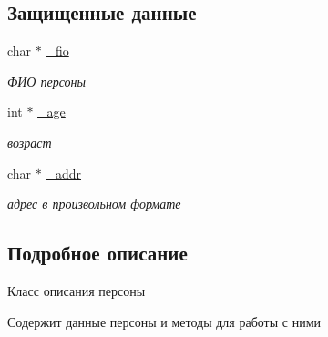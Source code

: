 \subsection*{Защищенные данные}
\begin{DoxyCompactItemize}
\item 
\hypertarget{class_polozkova___class___person_a8c4d8a3a01398787b503ea1801300b50}{char $\ast$ \hyperlink{class_polozkova___class___person_a8c4d8a3a01398787b503ea1801300b50}{\+\_\+fio}}\label{class_polozkova___class___person_a8c4d8a3a01398787b503ea1801300b50}

\begin{DoxyCompactList}\small\item\em ФИО персоны \end{DoxyCompactList}\item 
\hypertarget{class_polozkova___class___person_a238ba5b6acd075939966985901f33ea4}{int $\ast$ \hyperlink{class_polozkova___class___person_a238ba5b6acd075939966985901f33ea4}{\+\_\+age}}\label{class_polozkova___class___person_a238ba5b6acd075939966985901f33ea4}

\begin{DoxyCompactList}\small\item\em возраст \end{DoxyCompactList}\item 
\hypertarget{class_polozkova___class___person_adeb5a583e474d924e0a1596ac5cf5580}{char $\ast$ \hyperlink{class_polozkova___class___person_adeb5a583e474d924e0a1596ac5cf5580}{\+\_\+addr}}\label{class_polozkova___class___person_adeb5a583e474d924e0a1596ac5cf5580}

\begin{DoxyCompactList}\small\item\em адрес в произвольном формате \end{DoxyCompactList}\end{DoxyCompactItemize}


\subsection{Подробное описание}
Класс описания персоны 

Содержит данные персоны и методы для работы с ними 

